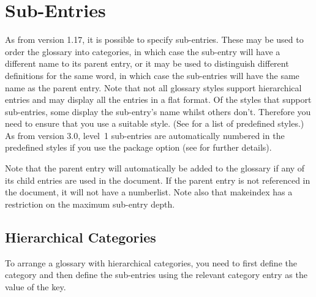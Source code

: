 \documentclass[report,inlinetitle]{nlctdoc}
\newcommand*{\gloskey}[2][newglossaryentry]{\csopt{#1}{#2}}
\begin{document}
\section{Sub-Entries}
\label{sec:subentries}

As from version 1.17, it is possible to specify sub-entries. These
may be used to order the glossary into categories, in which case the
sub-entry will have a different name to its parent entry, or it may
be used to distinguish different definitions for the same word, in
which case the sub-entries will have the same name as the parent
entry. Note that not all glossary styles support hierarchical
entries and may display all the entries in a flat format. Of the
styles that support sub-entries, some display the sub-entry's name
whilst others don't. Therefore you need to ensure that you use a
suitable style. (See  for a list of predefined
styles.) As from version 3.0, level~1 sub-entries are automatically
numbered in the predefined styles if you use the
 package option (see
 for further details).

Note that the parent entry will automatically be added to the
glossary if any of its child entries are used in the document.
If the parent entry is not referenced in the document, it will not
have a \gls{numberlist}. Note also that \gls{makeindex} has a
restriction on the maximum sub-entry depth.

\subsection{Hierarchical Categories}
\label{sec:hierarchical}

To arrange a glossary with hierarchical categories, you need to
first define the category and then define the sub-entries using the
relevant category entry as the value of the \gloskey{parent} key.
\end{document}
